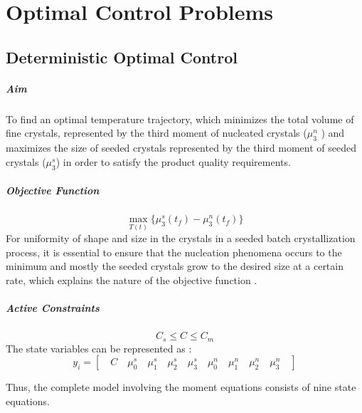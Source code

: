 \chapter{Optimal Control Problems}

\section{Deterministic Optimal Control} \label{deterministic}


\paragraph{Aim}
To find an optimal temperature trajectory, which minimizes the total volume of fine crystals, represented by the third moment of nucleated crystals ($\mu_{3}^{n}$ ) and maximizes the size of seeded crystals represented by the third moment of seeded crystals ($\mu_{3}^{s}$) in order to satisfy the product quality requirements.

\paragraph{Objective Function}
\begin{equation*}
\max_{T(t)}\lbrace{\mu_{3}^{s}(t_{f}) - \mu_{3}^{n}(t_{f})\rbrace } 
\end{equation*}
For uniformity of shape and size in the crystals in a seeded batch crystallization process, it is essential to ensure that the nucleation phenomena occurs to the minimum and mostly the seeded crystals grow to the desired size at a certain rate, which explains the nature of the objective function .

\paragraph{Active Constraints}
\begin{equation*}
C_{s}\leqslant C \leqslant C_{m}
\end{equation*}
The state variables can be represented as :
\begin{equation*}
y_{i} = \left[\quad C \quad \mu_{0}^{s} \quad \mu_{1}^{s}\quad \mu_{2}^{s}\quad \mu_{3}^{s}\quad \mu_{0}^{n}\quad \mu_{1}^{n}\quad \mu_{2}^{n}\quad \mu_{3}^{n}\quad\right]  
\end{equation*}

Thus, the complete model involving the moment equations consists of nine state equations. 

